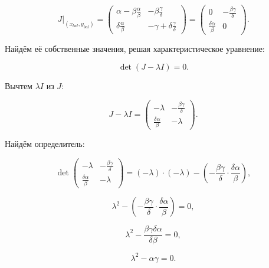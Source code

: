 \begin{equation}
	J\big|_{(x_{bal}, y_{bal})} =
	\begin{pmatrix}
		\alpha - \beta \frac{\alpha}{\beta} & - \beta \frac{\gamma}{\delta} \\
		\delta \frac{\alpha}{\beta} & -\gamma + \delta \frac{\gamma}{\delta}
	\end{pmatrix} = 
	\begin{pmatrix}
		0 & - \frac{\beta \gamma}{\delta} \\
		\frac{\delta \alpha}{\beta} & 0
	\end{pmatrix}.
\end{equation}

Найдём её собственные значения, решая характеристическое уравнение:

\begin{equation}
	\det \left( J - \lambda I \right) = 0.
\end{equation}

Вычтем $\lambda I$ из $J$:

\begin{equation}
	J - \lambda I =
	\begin{pmatrix}
		-\lambda & - \frac{\beta \gamma}{\delta} \\
		\frac{\delta \alpha}{\beta} & -\lambda
	\end{pmatrix}.
\end{equation}

Найдём определитель:

\begin{equation}
	\det
	\begin{pmatrix}
		-\lambda & - \frac{\beta \gamma}{\delta} \\
		\frac{\delta \alpha}{\beta} & -\lambda
	\end{pmatrix}
	= (-\lambda) \cdot (-\lambda) - \left( - \frac{\beta \gamma}{\delta} \cdot \frac{\delta \alpha}{\beta} \right),
\end{equation}

\begin{equation}
	\lambda^2 - \left( - \frac{\beta \gamma}{\delta} \cdot \frac{\delta \alpha}{\beta} \right) = 0,
\end{equation}

\begin{equation}
	\lambda^2 - \frac{\beta \gamma \delta \alpha}{\delta \beta} = 0,
\end{equation}

\begin{equation}
	\lambda^2 - \alpha \gamma = 0.
\end{equation}

